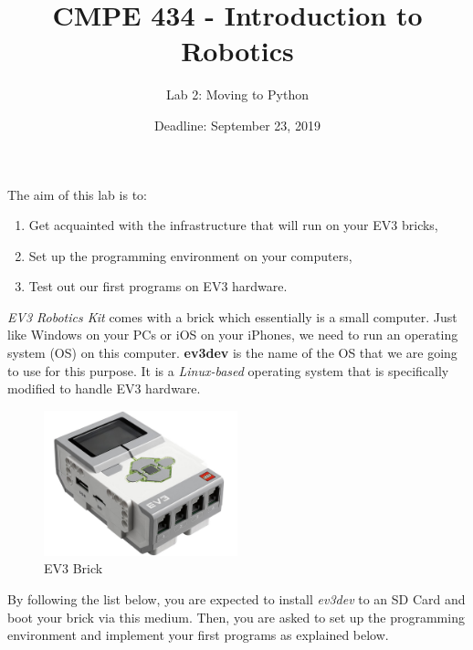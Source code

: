 \documentclass{scrartcl}
\title{CMPE 434 - Introduction to Robotics}
\subtitle{Lab 2: Moving to Python}
\date{Deadline: September 23, 2019}
\begin{document}
\maketitle

The aim of this lab is to:
\begin{enumerate}
    \item Get acquainted with the infrastructure that will run on your EV3 bricks,
    \item Set up the programming environment on your computers,
    \item Test out our first programs on EV3 hardware.
\end{enumerate} 

\textit{EV3 Robotics Kit} comes with a brick which essentially is a small computer. Just like Windows on your PCs or iOS on your iPhones, we need to run an operating system (OS) on this computer. \textbf{ev3dev} is the name of the OS that we are going to use for this purpose. It is a \textit{Linux-based} operating system that is specifically modified to handle EV3 hardware.
\\

\begin{figure}[h!]
    \begin{center}
        \includegraphics[width=0.5\textwidth]{brick.jpg}
        \caption{EV3 Brick}
    \end{center}
\end{figure}

By following the list below, you are expected to install \textit{ev3dev} to an SD Card and boot your brick via this medium. Then, you are asked to set up the programming environment and implement your first programs as explained below.
\end{document}
